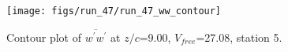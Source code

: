 \begin{figure}[H]
\centering
\texttt{[image: figs/run\_47/run\_47\_ww\_contour]}
\caption{Contour plot of $\overline{w^\prime w^\prime}$ at $z/c$=9.00, $V_{free}$=27.08, station 5.}
\end{figure}


